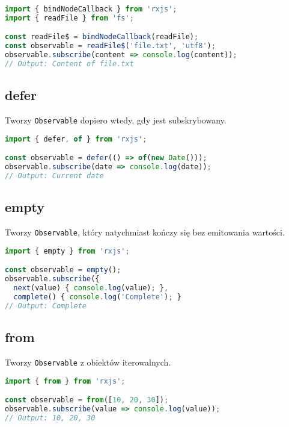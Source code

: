 \documentclass[a4paper,12pt]{article}
\begin{document}
\begin{lstlisting}[language=JavaScript, caption=Przykład użycia \texttt{bindNodeCallback}]
import { bindNodeCallback } from 'rxjs';
import { readFile } from 'fs';

const readFile$ = bindNodeCallback(readFile);
const observable = readFile$('file.txt', 'utf8');
observable.subscribe(content => console.log(content));
// Output: Content of file.txt
\end{lstlisting}

\subsection{defer}
Tworzy \texttt{Observable} dopiero wtedy, gdy jest subskrybowany.

\begin{lstlisting}[language=JavaScript, caption=Przykład użycia \texttt{defer}]
import { defer, of } from 'rxjs';

const observable = defer(() => of(new Date()));
observable.subscribe(date => console.log(date));
// Output: Current date
\end{lstlisting}

\subsection{empty}
Tworzy \texttt{Observable}, który natychmiast kończy się bez emitowania wartości.

\begin{lstlisting}[language=JavaScript, caption=Przykład użycia \texttt{empty}]
import { empty } from 'rxjs';

const observable = empty();
observable.subscribe({
  next(value) { console.log(value); },
  complete() { console.log('Complete'); }
// Output: Complete
\end{lstlisting}

\subsection{from}
Tworzy \texttt{Observable} z obiektów iterowalnych.

\begin{lstlisting}[language=JavaScript, caption=Przykład użycia \texttt{from}]
import { from } from 'rxjs';

const observable = from([10, 20, 30]);
observable.subscribe(value => console.log(value));
// Output: 10, 20, 30
\end{lstlisting}
\end{document}
